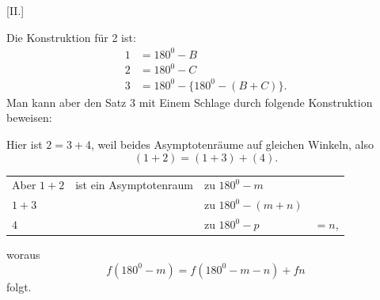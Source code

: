 %
\begin{center}[II.]\end{center}
Die Konstruktion für 2 ist:
\[
\begin{aligned}
1&=180^{0}-B\\
2&=180^{0}-C\\
3&=180^{0}-\{180^{0}-(B+C)\}.
\end{aligned}
\]
Man kann aber den Satz 3 mit Einem Schlage durch folgende Konstruktion beweisen:
\begin{center}\hspace{.5em}\end{center}
Hier ist $2=3+4$, weil beides Asymptotenräume auf gleichen Winkeln, also
\[
(1+2)=(1+3)+(4).
\]
\begin{center}
\begin{tabular}{@{}llll@{}}
Aber $1+2$&ist ein Asymptotenraum&zu $180^{0}-m$&\\
\hspace{2em}$1+3$&&zu $180^{0}-(m+n)$&\\
\hspace{2em}$4$&&zu $180^{0}-p$&$=n$,
\end{tabular}
\end{center}
\noindent woraus
\[
f(180^{0}-m)=f(180^{0}-m-n)+fn
\]
folgt.

